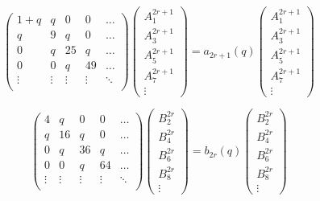 \documentclass{article}
\begin{document}
\begin{equation}
    \left(
    \begin{matrix}
        1+q & q & 0 & 0 & \dots \\
        q & 9 & q & 0 & \dots \\
        0 & q & 25 & q & \dots \\
        0 & 0 & q & 49 & \dots \\
        \vdots & \vdots & \vdots & \vdots & \ddots \\

    \end{matrix}
    \right)
    \left(
    \begin{matrix}
        A_1^{2r+1} \\
        A_3^{2r+1}\\
        A_5^{2r+1}\\
        A_7^{2r+1}\\
        \vdots
    \end{matrix}
    \right)
    = a_{2r+1}(q)
    \left(
    \begin{matrix}
        A_1^{2r+1} \\
        A_3^{2r+1}\\
        A_5^{2r+1}\\
        A_7^{2r+1}\\
        \vdots
    \end{matrix}
    \right)
\end{equation}

\begin{equation}
    \left(
    \begin{matrix}
        4 & q & 0 & 0 & \dots \\
        q & 16 & q & 0 & \dots \\
        0 & q & 36 & q & \dots \\
        0 & 0 & q & 64 & \dots \\
        \vdots & \vdots & \vdots & \vdots & \ddots \\

    \end{matrix}
    \right)
    \left(
    \begin{matrix}
        B_2^{2r} \\
        B_4^{2r}\\
        B_6^{2r}\\
        B_8^{2r}\\
        \vdots
    \end{matrix}
    \right)
    = b_{2r}(q)
    \left(
        \begin{matrix}
            B_2^{2r} \\
            B_4^{2r}\\
            B_6^{2r}\\
            B_8^{2r}\\
            \vdots
        \end{matrix}
    \right)
\end{equation}
\end{document}
